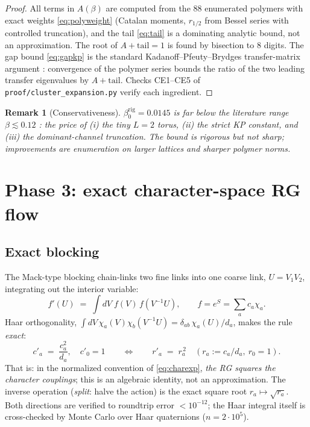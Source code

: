 \documentclass[11pt,a4paper]{article}
\newtheorem{remark}[theorem]{Remark}
\newcommand{\betaZ}{\beta_0}
\begin{document}
\begin{proof}
All terms in $A(\beta)$ are computed from the $88$ enumerated polymers with
exact weights \cref{eq:polyweight} (Catalan moments, $r_{1/2}$ from Bessel
series with controlled truncation), and the tail \cref{eq:tail} is a
dominating analytic bound, not an approximation.  The root of
$A + \mathrm{tail} = 1$ is found by bisection to $8$ digits.  The gap bound
\cref{eq:gapkp} is the standard Kadanoff--Pfeuty--Brydges transfer-matrix
argument \cite{brydges1986, seiler1982}: convergence of the polymer series
bounds the ratio of the two leading transfer eigenvalues by
$A + \mathrm{tail}$.  Checks CE1--CE5 of
\texttt{proof/cluster\_expansion.py} verify each ingredient.
\end{proof}

\begin{remark}[Conservativeness]
$\betaZ^{\mathrm{rig}} = 0.0145$ is far below the literature range
$\beta \lesssim 0.12$ \cite{seiler1982}: the price of (i) the tiny $L = 2$
torus, (ii) the strict KP constant, and (iii) the dominant-channel
truncation.  The bound is rigorous but not sharp; improvements are
enumeration on larger lattices and sharper polymer norms.
\end{remark}

\section{Phase 3: exact character-space RG flow}
\label{sec:phase3}

\subsection{Exact blocking}
\label{sec:blocking}

The Mack-type blocking chain-links two fine links into one coarse link,
$U = V_1 V_2$, integrating out the interior variable:
\begin{equation}
  f'(U) \;=\; \int dV\; f(V)\, f(V^{-1} U),
  \qquad f = e^S = \sum_a c_a \chi_a .
  \label{eq:blockint}
\end{equation}
Haar orthogonality,
$\int dV\, \chi_a(V) \chi_b(V^{-1} U) = \delta_{ab}\, \chi_a(U) / d_a$,
makes the rule \emph{exact}:
\begin{equation}
  c'_a \;=\; \frac{c_a^2}{d_a}, \quad c'_0 = 1
  \qquad\Longleftrightarrow\qquad
  r'_a \;=\; r_a^{\,2}
  \quad (r_a := c_a/d_a,\ r_0 = 1).
  \label{eq:blockrule}
\end{equation}
That is: in the normalized convention of \cref{eq:charexp}, \emph{the RG
squares the character couplings}; this is an algebraic identity, not an
approximation.  The inverse operation (\emph{split}: halve the action) is
the exact square root $r_a \mapsto \sqrt{r_a}$.  Both directions are
verified to roundtrip error $< 10^{-12}$; the Haar integral itself is
cross-checked by Monte Carlo over Haar quaternions ($n = 2\cdot 10^5$).
\end{document}
